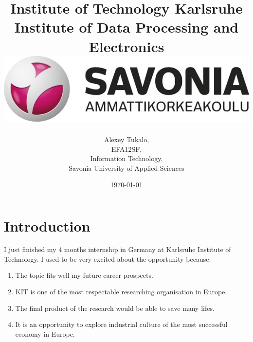\documentclass[english]{article}
\date{}
\begin{document}
\title{\vspace{2in}Institute of Technology Karlsruhe\\
\small Institute of Data Processing and Electronics\\
\vspace{0.5in}\includegraphics{savonia.jpg}}

\nopagebreak
\maketitle


\vspace{3in}

\author{
\begin{flushright}
Alexey Tukalo,\\
EFA12SF,\\
Information Technology,\\
Savonia University of Applied Sciences
\end{flushright}
}

\date{\today}
\thispagestyle{empty}

\newpage
\setcounter{page}{1}
\setcounter{tocdepth}{2}
\tableofcontents

\newpage


\section{Introduction}

I just finished my 4 months internship in Germany at Karlsruhe Institute of Technology. I used to be very excited about the opportunity because: 
\begin{enumerate}
\item The topic fits well my future career prospects.
\item KIT is one of the most respectable researching organisation in Europe.
\item The final product of the research would be able to save many lifes.
\item It is an opportunity to explore industrial culture of the most successful economy in Europe.
\end{enumerate}
\end{document}
